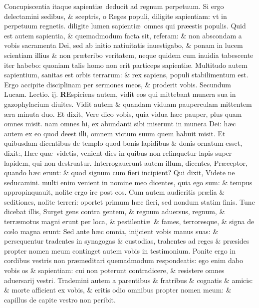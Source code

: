 \documentclass[a5paper,10pt]{book}
\def\rightmarginnote{%
	\lrmarginnote{\hskip\columnwidth \hskip -1em}}
\def\ae{æ}
\def\oe{œ}
\begin{document}
\begin{multicols*}{2}
Concupiscentia itaque sapienti\ae \ deducit ad regnum perpetuum. Si ergo delectamini sedibus, \& sceptris, o Reges populi, diligite sapientiam: vt in perpetuum regnetis. diligite lumen sapienti\ae \ omnes qui pr\ae estis
populis.
Quid est autem sapientia, \& quemadmodum facta sit, referam: \& non abscondam a vobis sacramenta Dei, sed ab initio natiuitatis inuestigabo, \& ponam in lucem scientiam illius \& non pr\ae teribo veritatem, neque quidem cum inuidia tabescente iter habebo: quoniam talis homo non erit particeps sapienti\ae .
Multitudo autem sapientium, sanitas est orbis terrarum: \& rex sapiens, populi stabilimentum est. Ergo accipite disciplinam per sermones meos, \& proderit vobis.
\fancyhead[C]{\color{red} Feria. vj. Dominic\ae . iij. post aduentum}
\newline \color{red} Secundum Lucam. \hfill Lectio. ij. \color{black}
\vspace{-.25em}
\lettrine[lines=2]{\bfseries \color{red} R}{}Espiciens\rightmarginnote{c. 21.} autem, vidit eos qui mittebant munera sua in gazophylacium diuites.
Vidit autem \& quandam viduam pauperculam mittentem \ae ra minuta duo. Et dixit, Vere dico vobis, quia vidua h\ae c pauper, plus quam omnes misit. nam omnes hi, ex abundanti sibi miserunt in munera Dei: h\ae c autem ex eo quod deest illi, omnem victum suum quem habuit misit.
Et quibusdam dicentibus de templo quod bonis lapidibus \& donis ornatum esset, dixit:, H\ae c qu\ae \ videtis, venient dies in quibus non relinquetur lapis super lapidem, qui non destruatur.
Interrogauerunt autem illum, dicentes, Pr\ae ceptor, quando h\ae c erunt: \& quod signum cum fieri incipient?
Qui dixit, Videte ne seducamini. multi enim venient in nomine meo dicentes, quia ego sum: \& tempus appropinquauit, nolite ergo ire post eos.
Cum autem audieritis pr\ae lia \& seditiones, nolite terreri: oportet primum h\ae c fieri, sed nondum statim finis.
Tunc dicebat illis, Surget gens contra gentem, \& regnum aduersus, regnum, \& terr\ae motus magni erunt per loca, \& pestilenti\ae \ \& fames, terroresque, \& signa de c\oe lo magna erunt: Sed ante h\ae c omnia, inijcient vobis manus suas: \& persequentur tradentes in synagogas \& custodias, trahentes ad reges \& pr\ae sides propter nomen meum continget autem vobis in testimonium.
Ponite ergo in cordibus vestris non pr\ae meditari quemadmodum respondeatis: ego enim dabo vobis os \& sapientiam: cui non poterunt contradicere, \& resistere omnes aduersarij vestri.
Trademini autem a parentibus \& fratribus \& cognatis \& amicis: \& morte afficient ex vobis, \& eritis odio omnibus propter nomen meum: \& capillus de capite vestro non peribit.

\end{multicols*}
\end{document}
